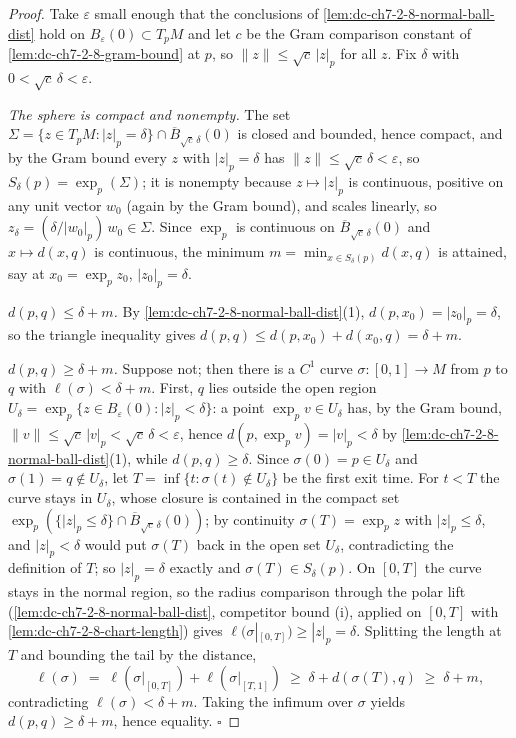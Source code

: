\begin{proof}
  \leanok
  Take $\varepsilon$ small enough that the conclusions of
  \cref{lem:dc-ch7-2-8-normal-ball-dist} hold on $B_\varepsilon(0)\subset
  T_pM$ and let $c$ be the Gram comparison constant of
  \cref{lem:dc-ch7-2-8-gram-bound} at $p$, so $\|z\|\le\sqrt c\,|z|_p$ for all
  $z$. Fix $\delta$ with $0<\sqrt c\,\delta<\varepsilon$.

  \emph{The sphere is compact and nonempty.} The set
  $\Sigma=\{z\in T_pM: |z|_p=\delta\}\cap\overline B_{\sqrt c\,\delta}(0)$ is
  closed and bounded, hence compact, and by the Gram bound every $z$ with
  $|z|_p=\delta$ has $\|z\|\le\sqrt c\,\delta<\varepsilon$, so
  $S_\delta(p)=\exp_p(\Sigma)$; it is nonempty because $z\mapsto|z|_p$ is
  continuous, positive on any unit vector $w_0$ (again by the Gram bound), and
  scales linearly, so $z_\delta=(\delta/|w_0|_p)\,w_0\in\Sigma$. Since
  $\exp_p$ is continuous on $\overline B_{\sqrt c\,\delta}(0)$ and
  $x\mapsto d(x,q)$ is continuous, the minimum
  $m=\min_{x\in S_\delta(p)}d(x,q)$ is attained, say at $x_0=\exp_p z_0$,
  $|z_0|_p=\delta$.

  \emph{$d(p,q)\le\delta+m$.} By \cref{lem:dc-ch7-2-8-normal-ball-dist}(1),
  $d(p,x_0)=|z_0|_p=\delta$, so the triangle inequality gives
  $d(p,q)\le d(p,x_0)+d(x_0,q)=\delta+m$.

  \emph{$d(p,q)\ge\delta+m$.} Suppose not; then there is a $C^1$ curve
  $\sigma:[0,1]\to M$ from $p$ to $q$ with $\ell(\sigma)<\delta+m$. First,
  $q$ lies outside the open region
  $U_\delta=\exp_p\{z\in B_\varepsilon(0):|z|_p<\delta\}$: a point
  $\exp_p v\in U_\delta$ has, by the Gram bound, $\|v\|\le\sqrt
  c\,|v|_p<\sqrt c\,\delta<\varepsilon$, hence
  $d(p,\exp_p v)=|v|_p<\delta$ by
  \cref{lem:dc-ch7-2-8-normal-ball-dist}(1), while $d(p,q)\ge\delta$.
  Since $\sigma(0)=p\in U_\delta$ and $\sigma(1)=q\notin U_\delta$, let
  $T=\inf\{t:\sigma(t)\notin U_\delta\}$ be the first exit time. For $t<T$
  the curve stays in $U_\delta$, whose closure is contained in the compact
  set $\exp_p(\{|z|_p\le\delta\}\cap\overline B_{\sqrt c\,\delta}(0))$; by
  continuity $\sigma(T)=\exp_p z$ with $|z|_p\le\delta$, and $|z|_p<\delta$
  would put $\sigma(T)$ back in the open set $U_\delta$, contradicting the
  definition of $T$; so $|z|_p=\delta$ exactly and $\sigma(T)\in
  S_\delta(p)$. On $[0,T]$ the curve stays in the normal region, so the
  radius comparison through the polar lift
  (\cref{lem:dc-ch7-2-8-normal-ball-dist}, competitor bound (i), applied on
  $[0,T]$ with \cref{lem:dc-ch7-2-8-chart-length}) gives
  $\ell(\sigma|_{[0,T]})\ge|z|_p=\delta$. Splitting the length at $T$ and
  bounding the tail by the distance,
  $$
  \ell(\sigma)\;=\;\ell(\sigma|_{[0,T]})+\ell(\sigma|_{[T,1]})
  \;\ge\;\delta+d(\sigma(T),q)\;\ge\;\delta+m,
  $$
  contradicting $\ell(\sigma)<\delta+m$. Taking the infimum over $\sigma$
  yields $d(p,q)\ge\delta+m$, hence equality. $\square$
\end{proof}

